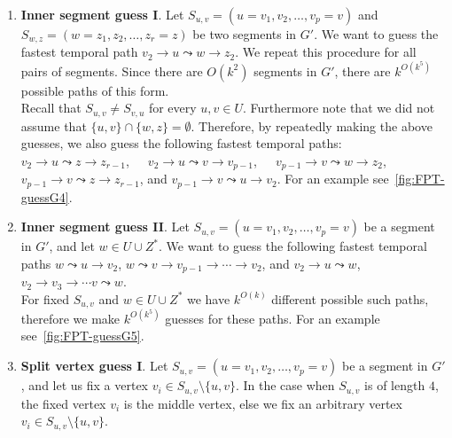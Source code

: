 \documentclass[a4paper,UKenglish,cleveref, autoref, thm-restate]{lipics-v2021}
\newcounter{guesscounter}
\begin{document}
\begin{enumerate}[G-1.]
	\setcounter{enumi}{\value{guesscounter}}
	\item \label{FPT-guessFTPamongv2z2}
	\textbf{Inner segment guess I}.
	Let $S_{u,v} = (u=v_1,v_2, \dots, v_p = v)$ and $S_{w,z} = (w=z_1,z_2, \dots, z_r = z)$ be two segments in $G'$. %
	We want to guess the fastest temporal path
	$v_2 \rightarrow u \leadsto w \rightarrow z_2$. 
	We repeat this procedure for all pairs of segments.
	Since there are $O(k^2)$ segments in $G'$,
	there are $k^{O(k^5)}$ possible paths of this form. \\
	Recall that $S_{u,v}\neq S_{v,u}$ for every $u,v\in U$. Furthermore note that we did not assume that $\{u,v\} \cap \{w,z\} = \emptyset$. Therefore, by repeatedly making the above guesses, we also guess the following fastest temporal paths: 
	${v_2 \rightarrow u \leadsto z \rightarrow z_{r-1}}$,\ \ \ 
	${v_2 \rightarrow u \leadsto v \rightarrow v_{p-1}}$,\ \ \  
	${v_{p-1} \rightarrow v \leadsto w \rightarrow z_{2}}$,\ \ \  
	${v_{p-1} \rightarrow v \leadsto z \rightarrow z_{r-1}}$, and  
	${v_{p-1} \rightarrow v \leadsto u \rightarrow v_{2}}$.
	For an example see~\cref{fig:FPT-guessG4}.
	\item \label{FPT:guess-uToSegmentz2}
	\textbf{Inner segment guess II}.
	Let $S_{u,v} = (u=v_1,v_2, \dots, v_p = v)$ be a segment in $G'$,
	and let $w \in U \cup Z^*$. %
	We want to
	guess the following fastest temporal paths
	$w \leadsto u \rightarrow v_2$, $w \leadsto v \rightarrow v_{p-1} \rightarrow \cdots \rightarrow v_2$,
	and
	$v_2 \rightarrow u \leadsto w$, $v_2 \rightarrow v_3 \rightarrow \cdots v \leadsto w$.
	\\
	For fixed $S_{u,v}$ and $w \in U \cup Z^*$ we have $k^{O(k)}$ different possible such paths, therefore we make $k^{O(k^5)}$ guesses for these paths.
	For an example see~\cref{fig:FPT-guessG5}.
	\item \label{FPT:guess-splitFromAnotherSegmentAndPaths}
	\textbf{Split vertex guess I}.
	Let $S_{u,v} = (u=v_1,v_2, \dots, v_p = v)$ be a segment in $G'$, and let us
	fix a vertex $v_i \in S_{u,v} \setminus \{u,v\}$.
	In the case when $S_{u,v}$ is of length $4$, the fixed vertex $v_i$ is the middle vertex, else we fix an arbitrary vertex $v_i \in S_{u,v} \setminus \{u,v\}$.

\end{enumerate}
\end{document}
